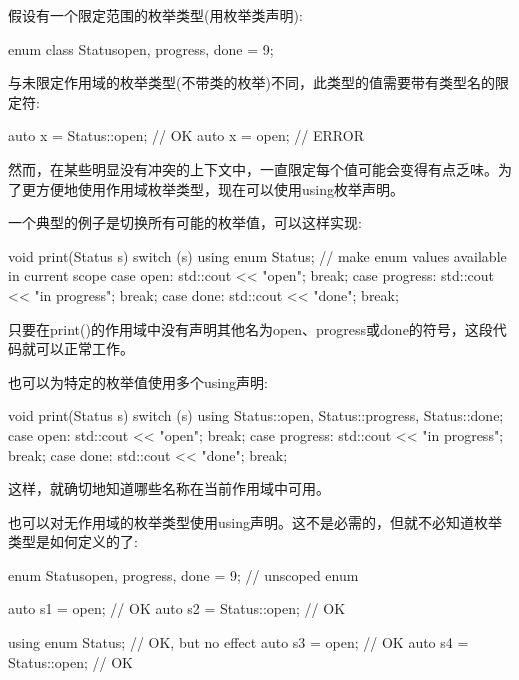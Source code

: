 

假设有一个限定范围的枚举类型(用枚举类声明):

\begin{cpp}
enum class Status{open, progress, done = 9};
\end{cpp}

与未限定作用域的枚举类型(不带类的枚举)不同，此类型的值需要带有类型名的限定符:

\begin{cpp}
auto x = Status::open; // OK
auto x = open; // ERROR
\end{cpp}

然而，在某些明显没有冲突的上下文中，一直限定每个值可能会变得有点乏味。为了更方便地使用作用域枚举类型，现在可以使用using枚举声明。

一个典型的例子是切换所有可能的枚举值，可以这样实现:

\begin{cpp}
void print(Status s)
{
	switch (s) {
	using enum Status; // make enum values available in current scope
	case open:
		std::cout << "open";
		break;
	case progress:
		std::cout << "in progress";
		break;
	case done:
		std::cout << "done";
		break;
	}
}
\end{cpp}

只要在print()的作用域中没有声明其他名为open、progress或done的符号，这段代码就可以正常工作。

也可以为特定的枚举值使用多个using声明:

\begin{cpp}
void print(Status s)
{
	switch (s) {
	using Status::open, Status::progress, Status::done;
	case open:
		std::cout << "open";
		break;
	case progress:
		std::cout << "in progress";
		break;
	case done:
		std::cout << "done";
		break;
	}
}
\end{cpp}

这样，就确切地知道哪些名称在当前作用域中可用。

也可以对无作用域的枚举类型使用using声明。这不是必需的，但就不必知道枚举类型是如何定义的了:

\begin{cpp}
enum Status{open, progress, done = 9}; // unscoped enum

auto s1 = open; // OK
auto s2 = Status::open; // OK

using enum Status; // OK, but no effect
auto s3 = open; // OK
auto s4 = Status::open; // OK
\end{cpp}





